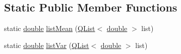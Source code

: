 \subsection*{Static Public Member Functions}
\begin{DoxyCompactItemize}
\item 
static \hyperlink{_super_l_u_support_8h_a8956b2b9f49bf918deed98379d159ca7}{double} \hyperlink{group___u_a_v_object_widget_utils_ga134c15f52a4eccf9aeb9bbacdc296b80}{list\-Mean} (\hyperlink{class_q_list}{Q\-List}$<$ \hyperlink{_super_l_u_support_8h_a8956b2b9f49bf918deed98379d159ca7}{double} $>$ list)
\item 
static \hyperlink{_super_l_u_support_8h_a8956b2b9f49bf918deed98379d159ca7}{double} \hyperlink{group___u_a_v_object_widget_utils_ga2f33179993858ca636461e78e3a7a3c8}{list\-Var} (\hyperlink{class_q_list}{Q\-List}$<$ \hyperlink{_super_l_u_support_8h_a8956b2b9f49bf918deed98379d159ca7}{double} $>$ list)
\end{DoxyCompactItemize}
